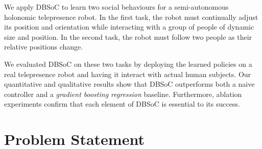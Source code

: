 \documentclass[letterpaper, 10 pt, conference]{ieeeconf}
\begin{document}

We apply DBSoC to learn two social behaviours for a semi-autonomous holonomic telepresence robot. In the first task, the robot must continually adjust its position and orientation while interacting with a group of people of dynamic size and position.  In the second task, the robot must follow two people as their relative positions change.

We evaluated DBSoC on these two tasks by deploying the learned policies on a real telepresence robot and having it interact with actual human subjects.  Our quantitative and qualitative results show that DBSoC outperforms both a naive controller and a \emph{gradient boosting regression} baseline.  Furthermore, ablation experiments confirm that each element of DBSoC is essential to its success.


\section{Problem Statement \label{sec:related_work}}
\end{document}
